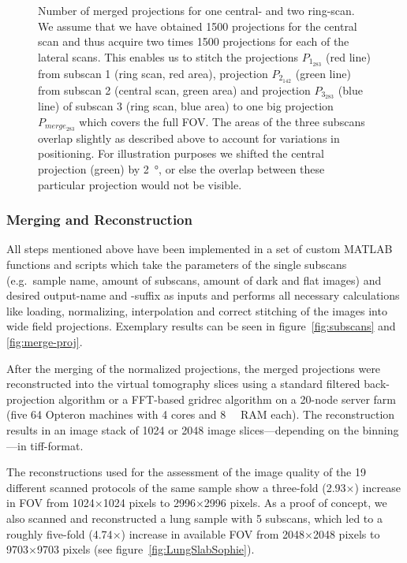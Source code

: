 \begin{figure*}
	\centering
	\caption[Number of merged projections for one central- and two ring-scan.]{Number of merged projections for one central- and two ring-scan. We assume that we have obtained 1500 projections for the central scan and thus acquire two times 1500 projections for each of the lateral scans. This enables us to stitch the projections $P_{1_{283}}$ %
    (red line) from subscan 1 (ring scan, red area), projection $P_{2_{142}}$ %
    (green line) from subscan 2 (central scan, green area) and projection $P_{3_{283}}$ %
    (blue line) of subscan 3 (ring scan, blue area) to one big projection $P_{merge_{283}}$ %
    which covers the full FOV. The areas of the three subscans overlap slightly as described above to account for variations in positioning. For illustration purposes we shifted the central projection (green) by \SI{2}{\degree}, or else the overlap between these particular projection would not be visible.}%
	\label{fig:amount of projections}%
\end{figure*}

\subsubsection{Merging and Reconstruction}
All steps mentioned above have been implemented in a set of custom MATLAB functions and scripts which take the parameters of the single subscans (e.g.\ sample name, amount of subscans, amount of dark and flat images) and desired output-name and -suffix as inputs and performs all necessary calculations like loading, normalizing, interpolation and correct stitching of the images into wide field projections. Exemplary results can be seen in figure~\ref{fig:subscans} and \ref{fig:merge-proj}.

\cbstart
After the merging of the normalized projections, the merged projections were reconstructed into the virtual tomography slices using a standard filtered back-projection algorithm or a FFT-based gridrec algorithm on a 20-node server farm (five \SI{64}{\bit} Opteron machines with 4 cores and \SI{8}{\giga\byte} RAM each). The reconstruction results in an image stack of 1024 or 2048 image slices---depending on the binning---in tiff-format.
\cbend

The reconstructions used for the assessment of the image quality of the 19 different scanned protocols of the same sample show a three-fold (2.93\(\times\)) increase in FOV from 1024\(\times\)1024 pixels to 2996\(\times\)2996 pixels. As a proof of concept, we also scanned and reconstructed a lung sample with 5 subscans, which led to a roughly five-fold (4.74\(\times\)) increase in available FOV from 2048\(\times\)2048 pixels to 9703\(\times\)9703 pixels (see figure~\ref{fig:LungSlabSophie}).
